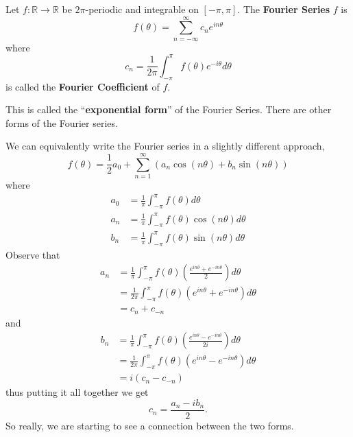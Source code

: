 \begin{defn}
Let $f:\mathbb{R}\to\mathbb{R}$ be $2\pi$-periodic and
integrable on $[-\pi,\pi]$. The \textbf{Fourier Series} $f$
is
\begin{equation}
f(\theta)=\sum^{\infty}_{n=-\infty}c_{n}e^{in\theta}
\end{equation}
where
\begin{equation}
c_{n} =
\frac{1}{2\pi}\int^{\pi}_{-\pi}f(\theta)e^{-i\theta}d\theta
\end{equation}
is called the \textbf{Fourier Coefficient} of $f$.
\end{defn}

\begin{rmk}
This is called the ``\textbf{exponential form}'' of the
Fourier Series. There are other forms of the Fourier series.
\end{rmk}

We can equivalently write the Fourier series in a slightly
different approach,
\begin{equation}
f(\theta) = \frac{1}{2}a_{0} +
\sum^{\infty}_{n=1}(a_{n}\cos(n\theta)+b_{n}\sin(n\theta))
\end{equation}
where
\begin{subequations}
\begin{align}
a_{0} &= \frac{1}{\pi}\int^{\pi}_{-\pi}f(\theta)d\theta \\
a_{n} &=
\frac{1}{\pi}\int^{\pi}_{-\pi}f(\theta)\cos(n\theta)d\theta\\
b_{n} &=
\frac{1}{\pi}\int^{\pi}_{-\pi}f(\theta)\sin(n\theta)d\theta
\end{align}
\end{subequations}
Observe that
\begin{subequations}
\begin{align}
a_{n}
&=\frac{1}{\pi}\int^{\pi}_{-\pi}f(\theta)\left(\frac{e^{in\theta}+e^{-in\theta}}{2}\right)d\theta
\\
&=
\frac{1}{2\pi}\int^{\pi}_{-\pi}f(\theta)(e^{in\theta}+e^{-in\theta})d\theta
\\
&= c_{n}+c_{-n}
\end{align}
\end{subequations}
and
\begin{subequations}
\begin{align}
b_{n} &=
\frac{1}{\pi}\int^{\pi}_{-\pi}f(\theta)\left(\frac{e^{in\theta}-e^{-in\theta}}{2i}\right)d\theta
\\
&=
\frac{1}{2\pi}\int^{\pi}_{-\pi}f(\theta)(e^{in\theta}-e^{-in\theta})d\theta
\\
&= i(c_{n}-c_{-n})
\end{align}
\end{subequations}
thus putting it all together we get
\begin{equation}
c_{n} = \frac{a_{n}-ib_{n}}{2}.
\end{equation}
So really, we are starting to see a connection between the
two forms.

